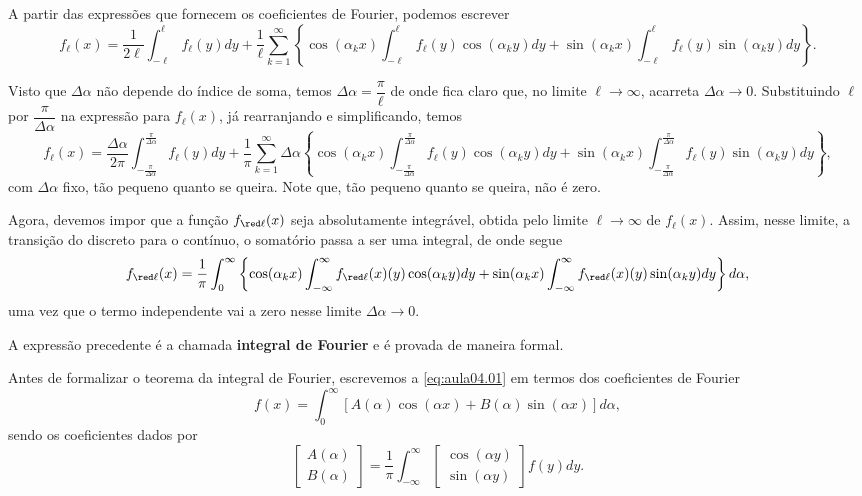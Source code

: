 A partir das expressões que fornecem os coeficientes de Fourier, podemos escrever
{\tiny
$$f_{\ell}(x) = \dfrac{1}{2\ell} \int_{-\ell}^{\ell} f_{\ell}(y) dy +
\dfrac{1}{\ell} \sum_{k=1}^{\infty}
\left\{
\cos(\alpha_k x)
\int_{-\ell}^{\ell} f_{\ell}(y) \cos(\alpha_{k}y) dy +
\sin(\alpha_{k}x)
\int_{-\ell}^{\ell} f_{\ell}(y) \sin(\alpha_{k}y) dy
\right\}.$$
}

Visto que $\Delta\alpha$ não depende do índice de soma, temos
$\Delta\alpha = \dfrac{\pi}{\ell}$  de onde fica claro que, no limite $\ell \to \infty$, acarreta $\Delta\alpha \to 0$. Substituindo $\ell$ por $\dfrac{\pi}{\Delta\alpha}$ na expressão para $f_{\ell}(x)$, já rearranjando e simplificando, temos
{\tiny
$$f_{\ell}(x) = \dfrac{\Delta\alpha}{2\pi} 
\int_{-\frac{\pi}{\Delta\alpha}}^{\frac{\pi}{\Delta\alpha}}
f_{\ell}(y) dy +
\dfrac{1}{\pi} 
\sum_{k=1}^{\infty}
\Delta\alpha 
\left\{
\cos(\alpha_{k}x)
\int_{-\frac{\pi}{\Delta\alpha}}^{\frac{\pi}{\Delta\alpha}}
f_{\ell}(y) \cos(\alpha_{k}y) dy +
\sin(\alpha_{k}x)
\int_{-\frac{\pi}{\Delta\alpha}}^{\frac{\pi}{\Delta\alpha}}
f_{\ell}(y) \sin(\alpha_{k}y) dy
\right\},$$
}
com $\Delta\alpha$ fixo, tão pequeno quanto se queira. Note que, tão pequeno quanto se queira, não é zero.

Agora, devemos impor que a função $f_{\red \ell}(x)$ seja absolutamente integrável, obtida pelo limite $\ell \to \infty$ de $f_{\ell}(x)$. Assim, nesse limite, a transição do discreto para o contínuo, o somatório passa a ser uma integral, de onde segue
{\small
\begin{equation}\label{eq:aula04.01}
f_{\red \ell}(x) = \dfrac{1}{\pi} 
\int_{0}^{\infty}
\left\{
\cos(\alpha_{k}x)
\int_{-\infty}^{\infty}
f_{\red \ell}(x)(y) \cos(\alpha_{k}y) dy +
\sin(\alpha_{k}x)
\int_{-\infty}^{\infty}
f_{\red \ell}(x)(y) \sin(\alpha_{k}y) dy\right\} d\alpha,
\end{equation}
}
uma vez que o termo independente vai a zero nesse limite $\Delta\alpha \to 0$.

A expressão precedente é a chamada \textbf{integral de Fourier} e é provada de maneira formal.

Antes de formalizar o teorema da integral de Fourier, escrevemos a \autoref{eq:aula04.01} em termos dos coeficientes de Fourier
\begin{equation}\label{eq:aula04.02}
f(x) = \int_{0}^{\infty}
[A(\alpha) \cos(\alpha x) + B(\alpha) \sin(\alpha x)] d\alpha,
\end{equation}
sendo os coeficientes dados por
\begin{equation}\label{eq:aula04.03}
\left[\begin{array}{c}
A(\alpha) \\
B(\alpha)
\end{array}\right]
=
\dfrac{1}{\pi} 
\int_{-\infty}^{\infty}
\left[\begin{array}{c}
\cos(\alpha y) \\
\sin(\alpha y)
\end{array}\right]
f(y) dy.
\end{equation}

